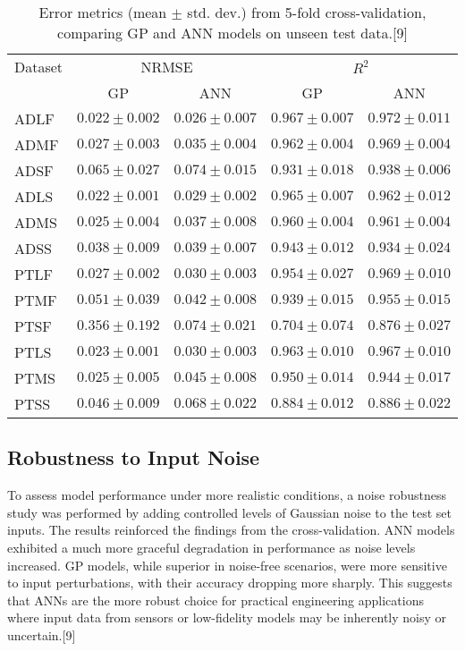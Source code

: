 \documentclass[12pt, a4paper]{report}
\begin{document}
\begin{table}[htbp]
\centering
\caption{Error metrics (mean $\pm$ std. dev.) from 5-fold cross-validation, comparing GP and ANN models on unseen test data.[9]}
\label{tab:nozzle_cv}
\begin{tabular}{@{}lcccc@{}}
\toprule
Dataset & \multicolumn{2}{c}{NRMSE} & \multicolumn{2}{c}{$R^2$} \\
\cmidrule(r){2-3} \cmidrule(l){4-5}
 & GP & ANN & GP & ANN \\
\midrule
ADLF & $0.022 \pm 0.002$ & $0.026 \pm 0.007$ & $0.967 \pm 0.007$ & $0.972 \pm 0.011$ \\
ADMF & $0.027 \pm 0.003$ & $0.035 \pm 0.004$ & $0.962 \pm 0.004$ & $0.969 \pm 0.004$ \\
ADSF & $0.065 \pm 0.027$ & $0.074 \pm 0.015$ & $0.931 \pm 0.018$ & $0.938 \pm 0.006$ \\
ADLS & $0.022 \pm 0.001$ & $0.029 \pm 0.002$ & $0.965 \pm 0.007$ & $0.962 \pm 0.012$ \\
ADMS & $0.025 \pm 0.004$ & $0.037 \pm 0.008$ & $0.960 \pm 0.004$ & $0.961 \pm 0.004$ \\
ADSS & $0.038 \pm 0.009$ & $0.039 \pm 0.007$ & $0.943 \pm 0.012$ & $0.934 \pm 0.024$ \\
PTLF & $0.027 \pm 0.002$ & $0.030 \pm 0.003$ & $0.954 \pm 0.027$ & $0.969 \pm 0.010$ \\
PTMF & $0.051 \pm 0.039$ & $0.042 \pm 0.008$ & $0.939 \pm 0.015$ & $0.955 \pm 0.015$ \\
PTSF & $0.356 \pm 0.192$ & $0.074 \pm 0.021$ & $0.704 \pm 0.074$ & $0.876 \pm 0.027$ \\
PTLS & $0.023 \pm 0.001$ & $0.030 \pm 0.003$ & $0.963 \pm 0.010$ & $0.967 \pm 0.010$ \\
PTMS & $0.025 \pm 0.005$ & $0.045 \pm 0.008$ & $0.950 \pm 0.014$ & $0.944 \pm 0.017$ \\
PTSS & $0.046 \pm 0.009$ & $0.068 \pm 0.022$ & $0.884 \pm 0.012$ & $0.886 \pm 0.022$ \\
\bottomrule
\end{tabular}
\end{table}

\subsection{Robustness to Input Noise}
To assess model performance under more realistic conditions, a noise robustness study was performed by adding controlled levels of Gaussian noise to the test set inputs. The results reinforced the findings from the cross-validation. ANN models exhibited a much more graceful degradation in performance as noise levels increased. GP models, while superior in noise-free scenarios, were more sensitive to input perturbations, with their accuracy dropping more sharply. This suggests that ANNs are the more robust choice for practical engineering applications where input data from sensors or low-fidelity models may be inherently noisy or uncertain.[9]
\end{document}
